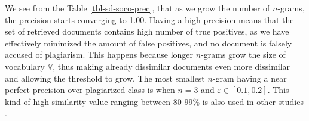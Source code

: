 \begin{table}[ht]
\centering
\caption{Precision with respect to plagiarized class, ranging various $n$-gram lengths and $\varepsilon$-ranges for SOCO-T. Values close or over 0.9 are bolded.}
\label{tbl-sd-soco-prec}
\end{table}

\noindent
We see from the Table \ref{tbl-sd-soco-prec}, that as we grow the number of $n$-grams, the precision starts converging to 1.00. Having a high precision means that the set of retrieved documents contains high number of true positives, as we have effectively minimized the amount of false positives, and no document is falsely accused of plagiarism. This happens because longer $n$-grams grow the size of vocabulary $\mathbb{V}$, thus making already dissimilar documents even more dissimilar and allowing the threshold to grow. The most smallest $n$-gram having a near perfect precision over plagiarized class is when $n=3$ and $\varepsilon \in [0.1, 0.2]$. This kind of high similarity value ranging between 80-99\% is also used in other studies \cite{AASCPD2012, OTIOLSS2015, Heblikar2015NormalizationBS, BUAA2009}. 

